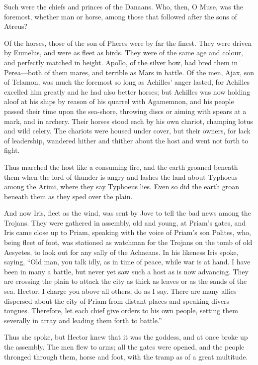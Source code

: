 Such were the chiefs and princes of the Danaans. Who, then, O Muse, was
the foremost, whether man or horse, among those that followed after the
sons of Atreus?

Of the horses, those of the son of Pheres were by far the finest. They
were driven by Eumelus, and were as fleet as birds. They were of the same
age and colour, and perfectly matched in height. Apollo, of the silver
bow, had bred them in Perea—both of them mares, and terrible as Mars
in battle. Of the men, Ajax, son of Telamon, was much the foremost so long
as Achilles’ anger lasted, for Achilles excelled him greatly and he had
also better horses; but Achilles was now holding aloof at his ships by
reason of his quarrel with Agamemnon, and his people passed their time
upon the sea-shore, throwing discs or aiming with spears at a mark, and in
archery. Their horses stood each by his own chariot, champing lotus and
wild celery. The chariots were housed under cover, but their owners, for
lack of leadership, wandered hither and thither about the host and went
not forth to fight.

Thus marched the host like a consuming fire, and the earth groaned beneath
them when the lord of thunder is angry and lashes the land about Typhoeus
among the Arimi, where they say Typhoeus lies. Even so did the earth groan
beneath them as they sped over the plain.

And now Iris, fleet as the wind, was sent by Jove to tell the bad news
among the Trojans. They were gathered in assembly, old and young, at
Priam’s gates, and Iris came close up to Priam, speaking with the voice of
Priam’s son Polites, who, being fleet of foot, was stationed as watchman
for the Trojans on the tomb of old Aesyetes, to look out for any sally of
the Achaeans. In his likeness Iris spoke, saying, “Old man, you talk idly,
as in time of peace, while war is at hand. I have been in many a battle,
but never yet saw such a host as is now advancing. They are crossing the
plain to attack the city as thick as leaves or as the sands of the sea.
Hector, I charge you above all others, do as I say. There are many allies
dispersed about the city of Priam from distant places and speaking divers
tongues. Therefore, let each chief give orders to his own people, setting
them severally in array and leading them forth to battle.”

Thus she spoke, but Hector knew that it was the goddess, and at once broke
up the assembly. The men flew to arms; all the gates were opened, and the
people thronged through them, horse and foot, with the tramp as of a great
multitude.

